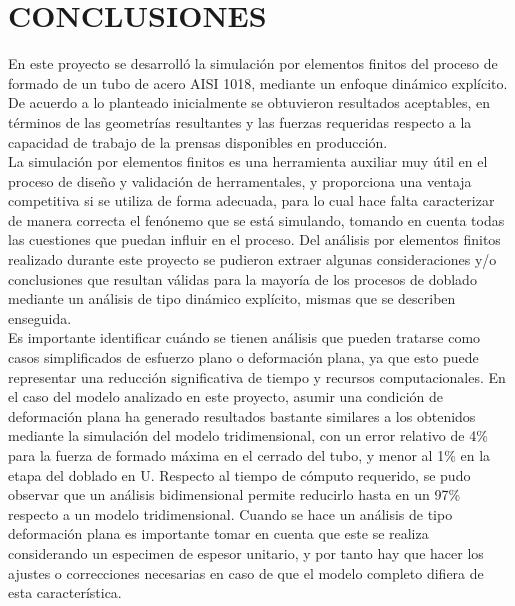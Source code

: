 \chapter*{CONCLUSIONES}


En este proyecto se desarrolló la simulación por elementos finitos del proceso de formado 
de un tubo de acero AISI 1018, mediante un enfoque dinámico explícito. De acuerdo a lo 
planteado inicialmente se obtuvieron resultados aceptables, en términos de las geometrías 
resultantes y las fuerzas requeridas respecto a la capacidad de trabajo de la prensas 
disponibles en producción.\\

La simulación por elementos finitos es una herramienta auxiliar muy útil en el proceso de 
diseño y validación de herramentales, y proporciona una ventaja competitiva si se utiliza 
de forma adecuada, para lo cual hace falta caracterizar de manera correcta el fenónemo 
que se está simulando, tomando en cuenta todas las cuestiones que puedan influir 
en el proceso. Del análisis por elementos finitos realizado durante este proyecto 
se pudieron extraer algunas consideraciones y/o conclusiones que resultan válidas 
para la mayoría de los procesos de doblado mediante un análisis de tipo dinámico explícito, mismas 
que se describen enseguida.\\

Es importante identificar cuándo se tienen análisis que pueden tratarse como casos simplificados 
de esfuerzo plano o deformación plana, ya que esto puede representar una reducción significativa 
de tiempo y recursos computacionales. En el caso del modelo analizado en este proyecto, asumir 
una condición de deformación plana ha generado resultados bastante similares a los obtenidos 
mediante la simulación del modelo tridimensional, con un error relativo de 4\% para la fuerza 
de formado máxima en el cerrado del tubo, y menor al 1\% en la etapa del doblado en U. 
Respecto al tiempo de cómputo requerido, se pudo observar que un análisis bidimensional 
permite reducirlo hasta en un 97\% respecto a un modelo tridimensional.
Cuando se hace un análisis de tipo deformación plana es importante tomar en cuenta que este 
se realiza considerando un especimen de espesor unitario, y por tanto hay que hacer los ajustes 
o correcciones necesarias en caso de que el modelo completo difiera de esta característica. \\

